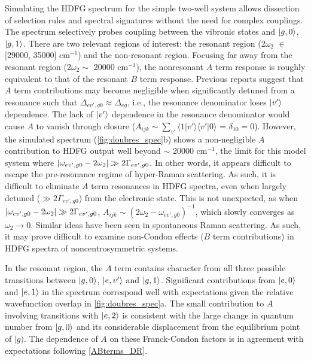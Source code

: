 \documentclass[aip, jcp, reprint, onecolumn]{revtex4-2}
\begin{document}
Simulating the HDFG spectrum for the simple two-well system allows dissection of selection rules and spectral signatures without the need for complex couplings.
The spectrum selectively probes coupling between the vibronic states and $\ket{g,0}$, $\ket{g,1}$.
There are two relevant regions of interest: the resonant region (2$\omega_2$ $\in$ [29000, 35000] cm$^{-1}$) and the non-resonant region.
Focusing far away from the resonant region ($2\omega_2 \sim$ 20000 cm$^{-1}$), the nonresonant $A$ term response is roughly equivalent to that of the resonant $B$ term response. 
Previous reports suggest that $A$ term contributions may become negligible when significantly detuned from a resonance such that $\Delta_{ev', g0} \approx \Delta_{eg}$, i.e., the resonance denominator loses $\ket{v'}$ dependence. \cite{Neddersen1989}
The lack of $\ket{v'}$ dependence in the resonance denominator would cause $A$ to vanish through closure ($A_{ijk} \sim \sum_{v'} \langle 1|v' \rangle \langle v'|0\rangle$ = $\delta_{10} = 0$).
However, the simulated spectrum (\autoref{fig:doubres_spec}b) shows a non-negligible $A$ contribution to HDFG output well beyond $\sim$ 20000 cm$^{-1}$, the limit for this model system where $\abs{\omega_{ev',g0} - 2\omega_2} \gg 2\Gamma_{ev',g0}$.
In other words, it appears difficult to escape the pre-resonance regime of hyper-Raman scattering.
As such, it is difficult to eliminate $A$ term resonances in HDFG spectra, even when largely detuned ($\gg 2\Gamma_{ev',g0}$) from the electronic state. 
This is not unexpected, as when $\abs{\omega_{ev',g0} - 2\omega_2} \gg 2\Gamma_{ev',g0}$, $A_{ijk} \sim \left(2\omega_2 - \omega_{ev',g0}\right)^{-1}$, which slowly converges as $\omega_2 \rightarrow 0$.
Similar ideas have been seen in spontaneous Raman scattering. \cite{Warshel1977, Li1990, Gong2015}
As such, it may prove difficult to examine non-Condon effects ($B$ term contributions) in HDFG spectra of noncentrosymmetric systems. 

In the resonant region, the $A$ term contains character from all three possible transitions between $\ket{g,0}$, $\ket{e,v'}$ and $\ket{g,1}$. 
Significant contributions from $\ket{e,0}$ and $\ket{e,1}$ in the spectrum correspond well with expectations given the relative wavefunction overlap in \autoref{fig:doubres_spec}a. 
The small contribution to $A$ involving transitions with $\ket{e,2}$ is consistent with the large change in quantum number from $\ket{g,0}$ and its considerable displacement from the equilibrium point of $|g)$.
The dependence of $A$ on these Franck-Condon factors is in agreement with expectations following \autoref{ABterms_DR}. 
\end{document}
